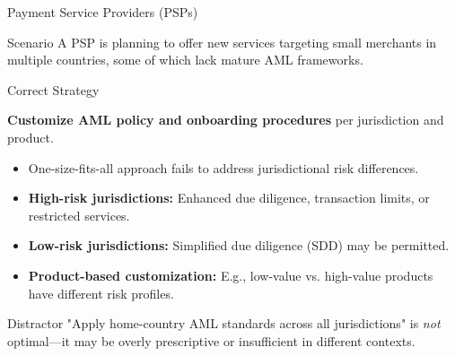 \documentclass{beamer}
\begin{document}
	\begin{frame}{Payment Service Providers (PSPs)}
		\begin{block}{Scenario}
			A PSP is planning to offer new services targeting small merchants in multiple countries, some of which lack mature AML frameworks.
		\end{block}
		\begin{block}{Correct Strategy}
			\begin{center}
				\textbf{Customize AML policy and onboarding procedures} per jurisdiction and product.
			\end{center}
		\end{block}
		\begin{itemize}
			\item One-size-fits-all approach fails to address jurisdictional risk differences.
			\item \textbf{High-risk jurisdictions:} Enhanced due diligence, transaction limits, or restricted services.
			\item \textbf{Low-risk jurisdictions:} Simplified due diligence (SDD) may be permitted.
			\item \textbf{Product-based customization:} E.g., low-value vs. high-value products have different risk profiles.
		\end{itemize}
		\begin{alertblock}{Distractor}
			"Apply home-country AML standards across all jurisdictions" is \textit{not} optimal—it may be overly prescriptive or insufficient in different contexts.
		\end{alertblock}
	\end{frame}
	
\end{document}
